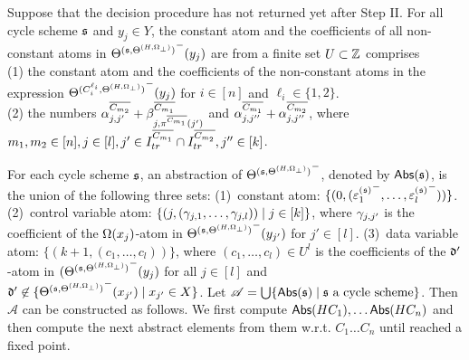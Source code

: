 \begin{lemma}\label{prop-bnd-domain-2}
Suppose that the decision procedure has not returned yet after Step II. 
For all cycle scheme ${\mathfrak{s} }$ and $y_j \in Y$, the constant atom and the coefficients of all non-constant atoms in ${\Theta^{({\mathfrak{s} }, \Theta^{(H,\Omega_\bot)})}}^-(y_j)$ are from a finite set $U \subset {\mathbb{Z} }$ comprises\\ (1)
the constant atom and the coefficients of the non-constant atoms in the expression ${\Theta^{(C^{\ell_i}_{i}, \Theta^{(H,\Omega_\bot)})}}^-(y_j)$ for $i\in [n]$ and $\ell_i \in \{1,2\}$.\smallskip\\(2) the numbers $\alpha^{\overline{C_{m_2}}}_{j,j'} + \beta^{\overline{C_{m_1}}}_{j,\pi^{\overline{C_{m_1}}}(j')}$ and $\alpha^{\overline{C_{m_1}}}_{j, j''} + \alpha^{\overline{C_{m_2}}}_{j,j''}$, where  $m_1,m_2 \in [n], j\in[l],j' \in I^{\overline{C_{m_1}}}_{tr} \cap I^{\overline{C_{m_2}}}_{tr},  j'' \in [k]$. 

\end{lemma}

For each cycle scheme ${\mathfrak{s} }$, an abstraction of ${\Theta^{({\mathfrak{s} }, \Theta^{(H,\Omega_\bot)})}}^-$, denoted by $\mathsf{Abs}({\mathfrak{s} })$,  is the union of the following three sets:
(1)~constant atom: $\{(0, ( {\varepsilon^{({\mathfrak{s} })}_{1}}^-,\dots, {\varepsilon^{({\mathfrak{s} })}_l}^-))\}$. (2)~control variable atom: $\{(j, (\gamma_{j,1},\dots, \gamma_{j,l})) \mid j \in [k]\}$, where $\gamma_{j, j'}$ is the coefficient of the $\Omega(x_j)$-atom in ${\Theta^{({\mathfrak{s} },\Theta^{(H,\Omega_\bot)})}}^-(y_{j'})$ for $j'\in[l]$. (3)~data variable atom: $\{(k+1, (c_1,\dots,c_l))\}$, where $(c_1,\dots,c_l) \in U^l$ is the coefficients of the $\mathfrak{d}'$-atom in ${(\Theta^{({\mathfrak{s} },\Theta^{(H,\Omega_\bot)})}}^-(y_{j})$ for all $j\in [l]$ and $\mathfrak{d}'\not\in \{{\Theta^{({\mathfrak{s} },\Theta^{(H,\Omega_\bot)})}}^-(x_{j'})\mid x_{j'}\in X\}$.
Let $\mathscr{A}=\bigcup \{\mathsf{Abs}({\mathfrak{s} }) \mid {\mathfrak{s} } \mbox{ a cycle scheme}\}$. Then $\mathscr{A}$ can be constructed as follows. We first compute $\mathsf{Abs}(HC_1), \ldots \mathsf{Abs}(HC_n)$ and then compute the next abstract elements from them w.r.t. $C_1\ldots C_n$ until reached a fixed point.\\
\smallskip\\


